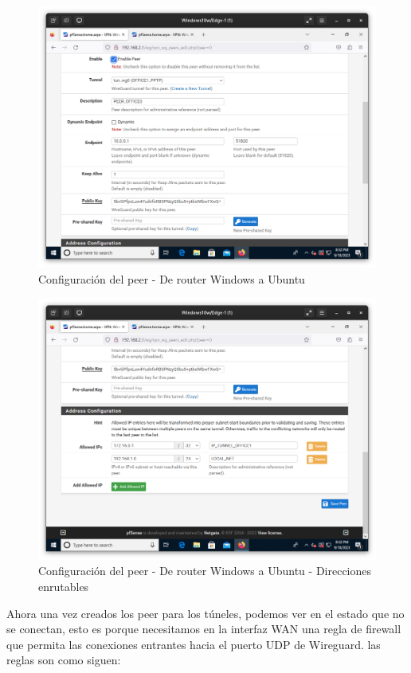 \begin{figure}[H]
	\centering
	\includegraphics[scale=0.30]{09}
	\caption{Configuración del peer - De router Windows a Ubuntu}
\end{figure}

\begin{figure}[H]
	\centering
	\includegraphics[scale=0.30]{10}
	\caption{Configuración del peer - De router Windows a Ubuntu - Direcciones enrutables}
\end{figure}

Ahora una vez creados los peer para los túneles, podemos ver en el estado que no se conectan, esto es porque necesitamos en la interfaz WAN una regla de firewall que permita las conexiones entrantes hacia el puerto UDP de Wireguard. las reglas son como siguen:

